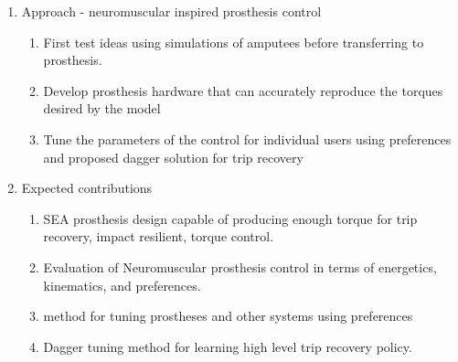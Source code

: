 \begin{enumerate}
    \item Approach - neuromuscular inspired prosthesis control
    \begin{enumerate}
        \item First test ideas using simulations of amputees before transferring
        to prosthesis. 
        \item Develop prosthesis hardware that can accurately reproduce the
        torques desired by the model
        \item Tune the parameters of the control for individual users using
        preferences and proposed dagger solution for trip recovery
    \end{enumerate}

    \item Expected contributions
    \begin{enumerate}
        \item SEA prosthesis design capable of producing enough torque for trip
        recovery, impact resilient, torque control.
        \item Evaluation of Neuromuscular prosthesis control in terms of
        energetics, kinematics, and preferences.
        \item method for tuning prostheses and other systems using preferences
        \item Dagger tuning method for learning high level trip recovery policy.
    \end{enumerate}
\end{enumerate}

